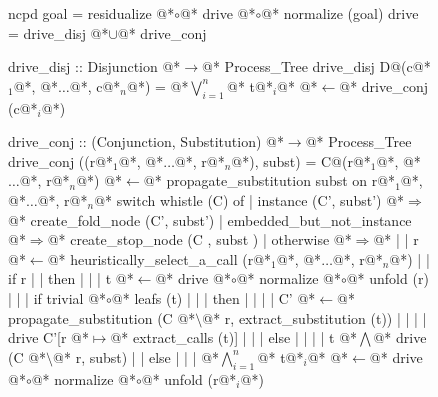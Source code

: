 \documentclass[12pt,a4paper]{report}
\begin{document}
\thispagestyle{empty}
\begin{figure}[h]
\begin{PseudoCode}[moredelim={[is][stringstyle]{@@}{@@}},
  moredelim={[is][\color{dkgreen}\bfseries]{@!}{@!}},
  moredelim={[is][\color{red}\bfseries]{!!}{!!}}]
ncpd goal = residualize @*$\circ$@* drive @*$\circ$@* normalize (goal)
drive     = drive_disj @*$\cup$@* drive_conj

drive_disj :: Disjunction @*$\to$@* Process_Tree
drive_disj D@(c@*$_1$@*, @*$\dots$@*, c@*$_n$@*) = @*$\bigvee_{i=1}^n$@* t@*$_i$@* @*$\leftarrow$@* drive_conj (c@*$_i$@*)

drive_conj :: (Conjunction, Substitution) @*$\to$@* Process_Tree
drive_conj ((r@*$_1$@*, @*$\dots$@*, r@*$_n$@*), subst) =
  C@(r@*$_1$@*, @*$\dots$@*, r@*$_n$@*) @*$\leftarrow$@* propagate_substitution subst on r@*$_1$@*, @*$\dots$@*, r@*$_n$@*
  switch whistle (C) of
  | instance (C', subst')     @*$\Rightarrow$@* create_fold_node (C', subst')
  | embedded_but_not_instance @*$\Rightarrow$@* create_stop_node (C , subst )
  | otherwise @*$\Rightarrow$@*
  | | r @*$\leftarrow$@* heuristically_select_a_call (r@*$_1$@*, @*$\dots$@*, r@*$_n$@*)
  | | if r
  | | then
  | | | t @*$\leftarrow$@* drive @*$\circ$@* normalize @*$\circ$@* unfold (r)
  | | | if trivial @*$\circ$@* leafs (t)
  | | | then
  | | | | C' @*$\leftarrow$@* propagate_substitution (C @*$\setminus$@* r, extract_substitution (t))
  | | | | drive C'[r @*$\mapsto$@* extract_calls (t)]
  | | | else
  | | | | t @*$\bigwedge$@* drive (C @*$\setminus$@* r, subst)
  | | else
  | | | @*$\bigwedge_{i=1}^n$@* t@*$_i$@* @*$\leftarrow$@* drive @*$\circ$@* normalize @*$\circ$@* unfold (r@*$_i$@*)
\end{PseudoCode}
\end{figure}
\end{document}
